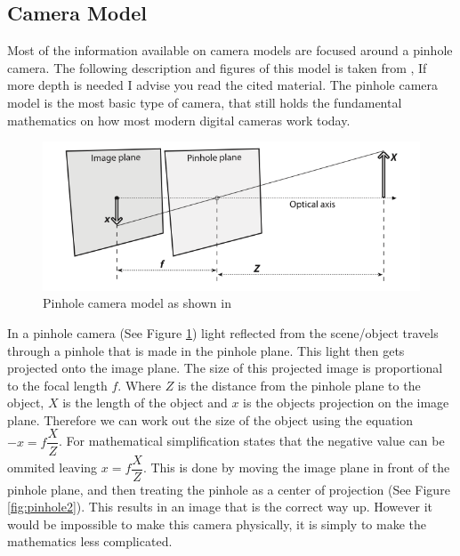 \documentclass[11pt,oneside]{report}
\begin{document}
				\subsection{Camera Model}
				Most of the information available on camera models are focused around a pinhole camera.
				The following description and figures of this model is taken from , If more depth is needed I advise you read the cited material.
				The pinhole camera model is the most basic type of camera, that still holds the fundamental mathematics on how most modern digital cameras work today.
				\begin{figure}[!ht]
				\centering
					\includegraphics[width=\textwidth]{pinhole}
					\caption{Pinhole camera model as shown in \protect{} {\label{fig:pinhole}}}

				\end{figure}
				In a pinhole camera (See Figure \ref{fig:pinhole}) light reflected from the scene/object travels through a pinhole that is made in the pinhole plane.
				This light then gets projected onto the image plane.
				The size of this projected image is proportional to the focal length $f$.
				Where $Z$ is the distance from the pinhole plane to the object, $X$ is the length of the object and $x$ is the objects projection on the image plane.
				Therefore we can work out the size of the object using the equation $-x=f\dfrac{X}{Z}$.
				For mathematical simplification  states that the negative value can be ommited leaving $x=f\dfrac{X}{Z}$.
				This is done by moving the image plane in front of the pinhole plane, and then treating the pinhole as a center of projection (See Figure \ref{fig:pinhole2}).
				This results in an image that is the correct way up. However it would be impossible to make this camera physically, it is simply to make the mathematics less complicated.
\end{document}
